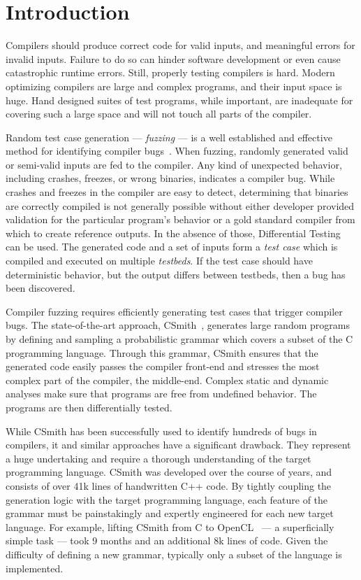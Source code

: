 \section{Introduction}\label{sec:intro}

Compilers should produce correct code for valid inputs, and meaningful errors
for invalid inputs. Failure to do so can hinder software development or even
cause catastrophic runtime errors. Still, properly testing compilers is hard.
Modern optimizing compilers are large and complex programs, and their input
space is huge. Hand designed suites of test programs, while important, are
inadequate for covering such a large space and will not touch all parts of the
compiler.

Random test case generation --- \emph{fuzzing} --- is a well established and
effective method for identifying compiler
bugs~\cite{Chen2014a,Chen2013,Kossatchev2005}. When fuzzing, randomly generated
valid or semi-valid inputs are fed to the compiler. Any kind of unexpected
behavior, including crashes, freezes, or wrong binaries, indicates a compiler
bug. While crashes and freezes in the compiler are easy to detect, determining
that binaries are correctly compiled is not generally possible without either
developer provided validation for the particular program's behavior or a gold
standard compiler from which to create reference outputs. In the absence of
those, Differential Testing~\cite{McKeeman1998} can be used. The generated code
and a set of inputs form a \emph{test case} which is compiled and executed on
multiple \emph{testbeds}. If the test case should have deterministic behavior,
but the output differs between testbeds, then a bug has been discovered.

Compiler fuzzing requires efficiently generating test cases that trigger
compiler bugs. The state-of-the-art approach, CSmith~\cite{Yang2011}, generates
large random programs by defining and sampling a probabilistic grammar which
covers a subset of the C programming language. Through this grammar, CSmith
ensures that the generated code easily passes the compiler front-end and
stresses the most complex part of the compiler, the middle-end. Complex static
and dynamic analyses make sure that programs are free from undefined behavior.
The programs are then differentially tested.

While CSmith has been successfully used to identify hundreds of bugs in
compilers, it and similar approaches have a significant drawback. They represent
a huge undertaking and require a thorough understanding of the target
programming language. CSmith was developed over the course of years, and
consists of over 41k lines of handwritten C++ code. By tightly coupling the
generation logic with the target programming language, each feature of the
grammar must be painstakingly and expertly engineered for each new target
language. For example, lifting CSmith from C to OpenCL~\cite{Lidbury2015a} --- a
superficially simple task --- took 9 months and an additional 8k lines of code.
Given the difficulty of defining a new grammar, typically only a subset of the
language is implemented.

